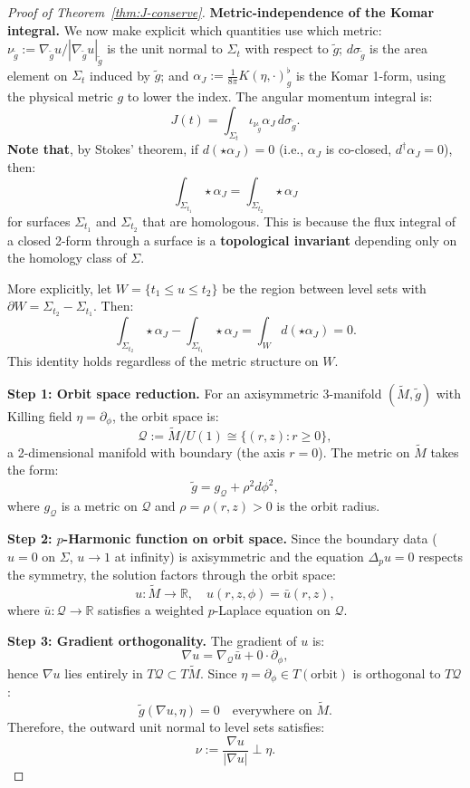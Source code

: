 \documentclass[12pt]{article}
\theoremstyle{plain}
\theoremstyle{definition}
\theoremstyle{remark}
\newcommand{\tM}{\tilde{M}}
\newcommand{\tg}{\tilde{g}}
\begin{document}
\begin{proof}[Proof of Theorem~\ref{thm:J-conserve}]
\textbf{Metric-independence of the Komar integral.} We now make explicit which quantities use which metric: $\nu_{\tg} := \nabla_{\tg} u / |\nabla_{\tg} u|_{\tg}$ is the unit normal to $\Sigma_t$ with respect to $\tg$; $d\sigma_{\tg}$ is the area element on $\Sigma_t$ induced by $\tg$; and $\alpha_J := \frac{1}{8\pi} K(\eta, \cdot)^\flat_g$ is the Komar 1-form, using the physical metric $g$ to lower the index. The angular momentum integral is:
\[
J(t) = \int_{\Sigma_t} \iota_{\nu_{\tg}} \alpha_J \, d\sigma_{\tg}.
\]
\textbf{Note that}, by Stokes' theorem, if $d(\star\alpha_J) = 0$ (i.e., $\alpha_J$ is co-closed, $d^\dagger\alpha_J = 0$), then:
\[
\int_{\Sigma_{t_1}} \star\alpha_J  = \int_{\Sigma_{t_2}} \star\alpha_J
\]
for surfaces $\Sigma_{t_1}$ and $\Sigma_{t_2}$ that are homologous. This is because the flux integral of a closed 2-form through a surface is a \textbf{topological invariant} depending only on the homology class of $\Sigma$.

More explicitly, let $W = \{t_1 \leq u \leq t_2\}$ be the region between level sets with $\partial W = \Sigma_{t_2} - \Sigma_{t_1}$. Then:
\[
\int_{\Sigma_{t_2}} \star\alpha_J - \int_{\Sigma_{t_1}} \star\alpha_J = \int_W d(\star\alpha_J) = 0.
\]
This identity holds regardless of the metric structure on $W$.

\textbf{Step 1: Orbit space reduction.}
For an axisymmetric 3-manifold $(\tM, \tg)$ with Killing field $\eta = \partial_\phi$, the orbit space is:
\[
\mathcal{Q} := \tM / U(1) \cong \{(r, z) : r \geq 0\},
\]
a 2-dimensional manifold with boundary (the axis $r = 0$). The metric on $\tM$ takes the form:
\[
\tg = g_{\mathcal{Q}} + \rho^2 d\phi^2,
\]
where $g_{\mathcal{Q}}$ is a metric on $\mathcal{Q}$ and $\rho = \rho(r, z) > 0$ is the orbit radius.

\textbf{Step 2: $p$-Harmonic function on orbit space.}
Since the boundary data ($u = 0$ on $\Sigma$, $u \to 1$ at infinity) is axisymmetric and the equation $\Delta_p u = 0$ respects the symmetry, the solution factors through the orbit space:
\[
u: \tM \to \mathbb{R}, \quad u(r, z, \phi) = \bar{u}(r, z),
\]
where $\bar{u}: \mathcal{Q} \to \mathbb{R}$ satisfies a weighted $p$-Laplace equation on $\mathcal{Q}$.

\textbf{Step 3: Gradient orthogonality.}
The gradient of $u$ is:
\[
\nabla u = \nabla_{\mathcal{Q}} \bar{u} + 0 \cdot \partial_\phi,
\]
hence $\nabla u$ lies entirely in $T\mathcal{Q} \subset T\tM$. Since $\eta = \partial_\phi \in T(\text{orbit})$ is orthogonal to $T\mathcal{Q}$:
\[
\tg(\nabla u, \eta) = 0 \quad \text{everywhere on } \tM.
\]
Therefore, the outward unit normal to level sets satisfies:
\[
\nu := \frac{\nabla u}{|\nabla u|} \perp \eta.
\]


\end{proof}
\end{document}
